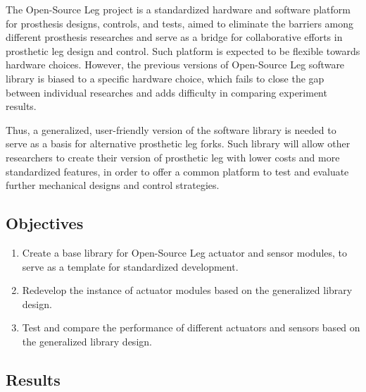 \documentclass[12pt]{article}
\begin{document}


The Open-Source Leg project is a standardized hardware and software platform for prosthesis designs, controls, and tests, aimed to eliminate the barriers among different prosthesis researches and serve as a bridge for collaborative efforts in prosthetic leg design and control. Such platform is expected to be flexible towards hardware choices. However, the previous versions of Open-Source Leg software library is biased to a specific hardware choice, which fails to close the gap between individual researches and adds difficulty in comparing experiment results. 

Thus, a generalized, user-friendly version of the software library is needed to serve as a basis for alternative prosthetic leg forks. Such library will allow other researchers to create their version of prosthetic leg with lower costs and more standardized features, in order to offer a common platform to test and evaluate further mechanical designs and control strategies.


\subsection{Objectives}

\begin{enumerate}
    \item {Create a base library for Open-Source Leg actuator and sensor modules, to serve as a template for standardized development.}
    \item {Redevelop the instance of actuator modules based on the generalized library design.}
    \item {Test and compare the performance of different actuators and sensors based on the generalized library design.}
\end{enumerate}

\subsection{Results}
\end{document}
